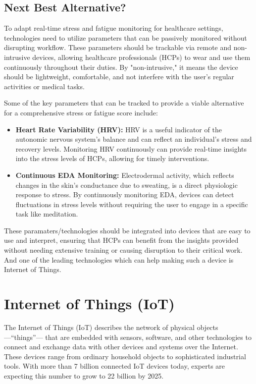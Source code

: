 \subsection{Next Best Alternative?}
To adapt real-time stress and fatigue monitoring for healthcare settings, technologies need to utilize parameters that can be passively monitored without disrupting workflow. These parameters should be trackable via remote and non-intrusive devices, allowing healthcare professionals (HCPs) to wear and use them continuously throughout their duties. By "non-intrusive," it means the device should be lightweight, comfortable, and not interfere with the user's regular activities or medical tasks.

Some of the key parameters that can be tracked to provide a viable alternative for a comprehensive stress or fatigue score include:

\begin{itemize}
    \item \textbf{Heart Rate Variability (HRV):} HRV is a useful indicator of the autonomic nervous system's balance and can reflect an individual's stress and recovery levels. Monitoring HRV continuously can provide real-time insights into the stress levels of HCPs, allowing for timely interventions.
    \item \textbf{Continuous EDA Monitoring:} Electrodermal activity, which reflects changes in the skin's conductance due to sweating, is a direct physiologic response to stress. By continuously monitoring EDA, devices can detect fluctuations in stress levels without requiring the user to engage in a specific task like meditation.
\end{itemize}

These paramaters/technologies should be integrated into devices that are easy to use and interpret, ensuring that HCPs can benefit from the insights provided without needing extensive training or causing disruption to their critical work. And one of the leading technologies which can help making such a device is Internet of Things.


\section{Internet of Things (IoT)}
The Internet of Things (IoT) describes the network of physical objects —``things”— that are embedded with sensors, software, and other technologies to connect and exchange data with other devices and systems over the Internet. These devices range from ordinary household objects to sophisticated industrial tools. With more than 7 billion connected IoT devices today, experts are expecting this number to grow to 22 billion by 2025. \cite{ref16}\\

